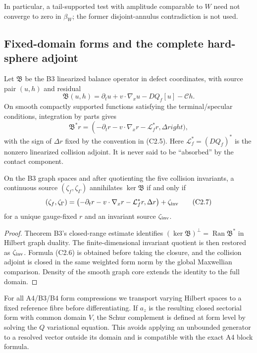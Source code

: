 In particular, a tail-supported test with amplitude comparable to $W$ need
not converge to zero in $\beta_W$; the former disjoint-annulus contradiction
is not used.

\subsection{Fixed-domain forms and the complete hard-sphere adjoint}

Let $\mathfrak B$ be the B3 linearized balance operator in defect coordinates,
with source pair $(u,h)$ and residual
\[
 \mathfrak B(u,h)
 =\partial_tu+v\cdot\nabla_xu-DQ_f[u]-\mathcal C h.      \tag{C2.5}
\]
On smooth compactly supported functions satisfying the terminal/specular
conditions, integration by parts gives
\[
 \mathfrak B^*r=
 \left(-\partial_tr-v\cdot\nabla_xr-\mathcal L_f^*r,
       \Delta r
ight),                                  \tag{C2.6}
\]
with the sign of $\Delta r$ fixed by the convention in (C2.5).
Here $\mathcal L_f^*=(DQ_f)^*$ is the nonzero linearized collision adjoint.
It is never said to be ``absorbed'' by the contact component.

\begin{theorem}
\label{thm:r23-c2-annihilator}
On the B3 graph spaces and after quotienting the five collision invariants, a
continuous source $(\zeta_f,\zeta_\Gamma)$ annihilates
$\ker\mathfrak B$ if and only if
\[
 (\zeta_f,\zeta_\Gamma)=
 \left(-\partial_tr-v\cdot\nabla_xr-\mathcal L_f^*r,
       \Delta r\right)+\zeta_{\rm inv}                   \tag{C2.7}
\]
for a unique gauge-fixed $r$ and an invariant source
$\zeta_{\rm inv}$.
\end{theorem}

\begin{proof}
Theorem B3's closed-range estimate identifies
$(\ker\mathfrak B)^\perp=\operatorname{Ran}\mathfrak B^*$ in Hilbert graph
duality.  The finite-dimensional invariant quotient is then restored as
$\zeta_{\rm inv}$.  Formula (C2.6) is obtained before taking the closure, and
the collision adjoint is closed in the same weighted form norm by the global
Maxwellian comparison.  Density of the smooth graph core extends the identity
to the full domain.
\end{proof}

For all A4/B3/B4 form compressions we transport varying Hilbert spaces to a
fixed reference fibre before differentiating.  If $a_z$ is the resulting
closed sectorial form with common domain $V$, the Schur complement is defined
at form level by solving the $Q$ variational equation.  This avoids applying an
unbounded generator to a resolved vector outside its domain and is compatible
with the exact A4 block formula.

